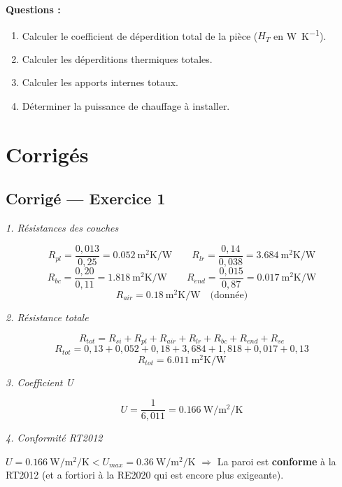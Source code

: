 \textbf{Questions :}
\begin{enumerate}
  \item Calculer le coefficient de déperdition total de la pièce (\(H_T\) en \si{\watt\per\kelvin}).
  \item Calculer les déperditions thermiques totales.
  \item Calculer les apports internes totaux.
  \item Déterminer la puissance de chauffage à installer.
\end{enumerate}

\newpage
\section*{Corrigés}

\subsection*{Corrigé — Exercice 1}

\textit{1. Résistances des couches}

\[
  R_{pl} = \frac{0{,}013}{0{,}25} = \SI{0,052}{\meter\squared\kelvin\per\watt}
  \qquad
  R_{lr} = \frac{0{,}14}{0{,}038} = \SI{3,684}{\meter\squared\kelvin\per\watt}
\]
\[
  R_{bc} = \frac{0{,}20}{0{,}11} = \SI{1,818}{\meter\squared\kelvin\per\watt}
  \qquad
  R_{end} = \frac{0{,}015}{0{,}87} = \SI{0,017}{\meter\squared\kelvin\per\watt}
\]
\[
  R_{air} = \SI{0,18}{\meter\squared\kelvin\per\watt} \quad \text{(donnée)}
\]

\textit{2. Résistance totale}

\[
  R_{tot} = R_{si} + R_{pl} + R_{air} + R_{lr} + R_{bc} + R_{end} + R_{se}
\]
\[
  R_{tot} = 0{,}13 + 0{,}052 + 0{,}18 + 3{,}684 + 1{,}818 + 0{,}017 + 0{,}13
\]
\[
  \boxed{R_{tot} = \SI{6,011}{\meter\squared\kelvin\per\watt}}
\]

\textit{3. Coefficient U}

\[
  \boxed{U = \frac{1}{6{,}011} = \SI{0,166}{\watt\per\meter\squared\per\kelvin}}
\]

\textit{4. Conformité RT2012}

\(U = \SI{0,166}{\watt\per\meter\squared\per\kelvin} < U_{max} = \SI{0,36}{\watt\per\meter\squared\per\kelvin}\)
\(\Rightarrow\) La paroi est \textbf{conforme} à la RT2012 (et a fortiori à la RE2020 qui est
encore plus exigeante).

